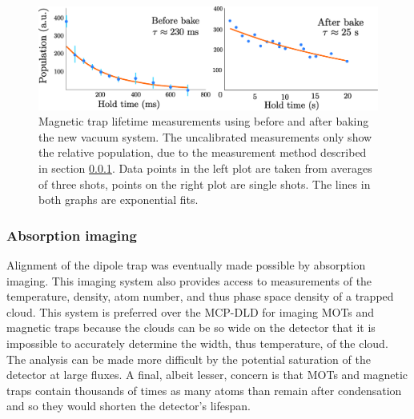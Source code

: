	\begin{figure}
		\includegraphics[width=\textwidth]{fig/lattice/trap_lifetimes}
		\caption{Magnetic trap lifetime measurements using before and after baking the new vacuum system. 
		The uncalibrated measurements only show the relative population, due to the measurement method described in section \ref{sec:abs_img}.
		Data points in the left plot are taken from averages of three shots, points on the right plot are single shots.
		The lines in both graphs are exponential fits.}
		\label{fig:lifetime}
	\end{figure}


\subsubsection{Absorption imaging}
\label{sec:abs_img}
		
	Alignment of the dipole trap was eventually made possible by absorption imaging.
	This imaging system also provides access to measurements of the temperature, density, atom number, and thus phase space density of a trapped cloud.
	This system is preferred over the MCP-DLD for imaging MOTs and magnetic traps because 
	the clouds can be so wide on the detector that it is impossible to accurately determine the width, thus temperature, of the cloud.
	The analysis can be made more difficult by the potential saturation of the detector at large fluxes.
	A final, albeit lesser, concern is that MOTs and magnetic traps contain thousands of times as many atoms than remain after condensation and so they would shorten the detector's lifespan.
	

